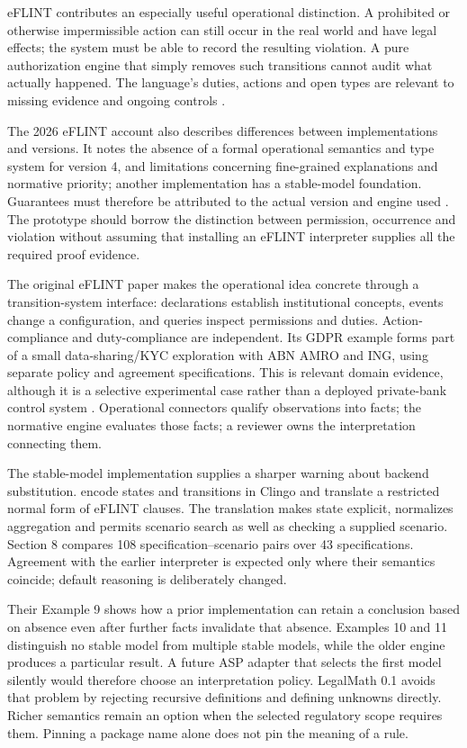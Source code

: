 eFLINT contributes an especially useful operational distinction. A prohibited or
otherwise impermissible action can still occur in the real world and have legal
effects; the system must be able to record the resulting violation. A pure
authorization engine that simply removes such transitions cannot audit what
actually happened. The language's duties, actions and open types are relevant
to missing evidence and ongoing controls \citep[secs.~3--5]{eflint2026}.

The 2026 eFLINT account also describes differences between implementations and
versions. It notes the absence of a formal operational semantics and type system
for version 4, and limitations concerning fine-grained explanations and normative
priority; another implementation has a stable-model foundation. Guarantees must
therefore be attributed to the actual version and engine used
\citep[secs.~6--7]{eflint2026}. The prototype should borrow the distinction between
permission, occurrence and violation without assuming that installing an eFLINT
interpreter supplies all the required proof evidence.

The original eFLINT paper makes the operational idea concrete through a
transition-system interface: declarations establish institutional concepts,
events change a configuration, and queries inspect permissions and duties.
Action-compliance and duty-compliance are independent. Its GDPR example forms
part of a small data-sharing/KYC exploration with ABN AMRO and ING, using separate
policy and agreement specifications. This is relevant domain evidence, although
it is a selective experimental case rather than a deployed private-bank control
system \citep[secs.~3--5]{eflint2020}. Operational connectors qualify observations
into facts; the normative engine evaluates those facts; a reviewer owns the
interpretation connecting them.

The stable-model implementation supplies a sharper warning about backend
substitution. \citet[secs.~4--7]{eflintstable2025} encode states and transitions
in Clingo and translate a restricted normal form of eFLINT clauses. The
translation makes state explicit, normalizes aggregation and permits scenario
search as well as checking a supplied scenario. Section 8 compares 108
specification--scenario pairs over 43 specifications. Agreement with the earlier
interpreter is expected only where their semantics coincide; default reasoning
is deliberately changed.

Their Example 9 shows how a prior implementation can retain a conclusion based
on absence even after further facts invalidate that absence. Examples 10 and 11
distinguish no stable model from multiple stable models, while the older engine
produces a particular result. A future ASP adapter that selects the first model
silently would therefore choose an interpretation policy. LegalMath 0.1 avoids
that problem by rejecting recursive definitions and defining unknowns directly.
Richer semantics remain an option when the selected regulatory scope requires
them. Pinning a package name alone does not pin the meaning of a rule.


